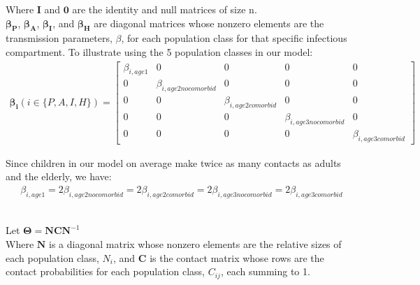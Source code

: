 \documentclass{article}
\begin{document}
Where $\boldsymbol{I}$ and $\boldsymbol{0}$ are the identity and null matrices of size n. \\

$\boldsymbol{\beta_P}$, $\boldsymbol{\beta_A}$, $\boldsymbol{\beta_I}$, and $\boldsymbol{\beta_H}$ are diagonal matrices whose nonzero elements are the transmission parameters, $\beta$, for each population class for that specific infectious compartment. To illustrate using the 5 population classes in our model:
\begin{gather}
   \boldsymbol{\beta_i} (i \in \{P,A,I,H\}) = 
   \begin{bmatrix}
   \beta_{i,age1} & 0 & 0 & 0 & 0 \\
   0 & \beta_{i,age2nocomorbid} & 0 & 0 & 0 \\
   0 & 0 & \beta_{i,age2comorbid} & 0 & 0 \\
   0 & 0 & 0 & \beta_{i,age3nocomorbid} & 0 \\
   0 & 0 & 0 & 0 & \beta_{i,age3comorbid}
   \end{bmatrix}
\end{gather}

Since children in our model on average make twice as many contacts as adults and the elderly, we have:
\begin{gather*}
   \beta_{i,age1} = 2\beta_{i,age2nocomorbid} =  2\beta_{i,age2comorbid} = 2\beta_{i,age3nocomorbid} = 2\beta_{i,age3comorbid}
\end{gather*}\\
\newpage

Let $\boldsymbol{\Theta} = \boldsymbol{N} \boldsymbol{C} \boldsymbol{N}^{-1}$\\

Where $\boldsymbol{N}$ is a diagonal matrix whose nonzero elements are the relative sizes of each population class, $N_i$, and $\boldsymbol{C}$ is the contact matrix whose rows are the contact probabilities for each population class, $C_{ij}$, each summing to 1.\\
\end{document}

